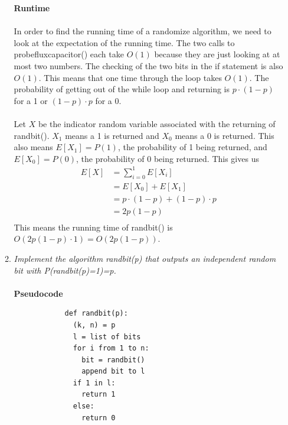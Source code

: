 \documentclass[12pt]{article}
\begin{document}
\begin{enumerate}
\begin{enumerate}
			\textbf{Runtime}\\
			\\
			In order to find the running time of a randomize algorithm, we need to look at the expectation of the running time.
			The two calls to probefluxcapacitor() each take $O(1)$ because they are just looking at at most two numbers. 
			The checking of the two bits in the if statement is also $O(1)$.  
			This means that one time through the loop takes $O(1)$.
			The probability of getting out of the while loop and returning is $p \cdot (1-p)$ for a 1 or $(1-p) \cdot p$ for a 0.\\
			\\
			Let $X$ be the indicator random variable associated with the returning of randbit().  
			$X_1$ means a 1 is returned and $X_0$ means a 0 is returned.  
			This also means $E[X_1] = P(1)$, the probability of 1 being returned, and $E[X_0] = P(0)$, the probability of 0 being returned.
			This gives us
			\begin{align*}
			E[X] &= \sum_{i=0}^{1} E[X_i]\\
			&= E[X_0] + E[X_1]\\
			&= p \cdot (1-p) + (1-p) \cdot p\\
			&= 2p(1-p)\\
			\end{align*}
			This means the running time of randbit() is $O(2p(1-p) \cdot 1) = O(2p(1-p))$.
			
			\item \textit{Implement the algorithm randbit(p) that outputs 
			an independent random bit with P(randbit(p)=1)=p.}\\
			\\
			\textbf{Pseudocode}
			\begin{verbatim}
			def randbit(p):
			  (k, n) = p
			  l = list of bits
			  for i from 1 to n:
			    bit = randbit()
			    append bit to l
			  if 1 in l:
			    return 1
			  else:
			    return 0


\end{verbatim}
\end{enumerate}
\end{enumerate}
\end{document}

